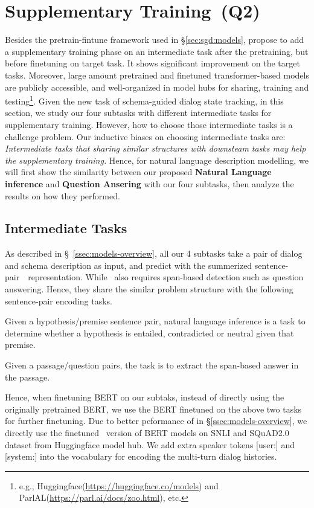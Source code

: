 \section{Supplementary Training~(Q2)}
\label{sec:sgd:sup-training}
Besides the pretrain-fintune framework used in \S\ref{sec:sgd:models},
\citet{phang2018sentence} propose to add a supplementary training
phase on an intermediate task after the pretraining, but before
finetuning on target task. It shows significant improvement on the
target tasks. Moreover, large amount pretrained and finetuned
transformer-based models are publicly accessible, and well-organized
in model hubs for sharing, training and testing\footnote{e.g.,
  Huggingface(\url{https://huggingface.co/models}) and
  ParlAL(\url{https://parl.ai/docs/zoo.html}), etc.}.  Given the new
task of schema-guided dialog state tracking, in this section, we study
our four subtasks with different intermediate tasks for supplementary
training. However, how to choose those intermediate tasks is a
challenge problem. Our inductive biases on choosing intermediate tasks
are: \textit{Intermediate tasks that sharing similar structures with
  downsteam tasks may help the supplementary training.}  Hence, for
natural language description modelling, we will first show the
similarity between our proposed \textbf{Natural Language inference}
and \textbf{Question Ansering} with our four subtasks, then analyze
the results on how they performed.

\subsection{Intermediate Tasks}
\label{ssec:intermediate-tasks}
As described in \S~\ref{ssec:models-overview}, all our 4
subtasks take a pair of dialog and schema description as input, and
predict with the summerized sentence-pair~\CLS~representation. While
\NSL~also requires span-based detection such as question
answering. Hence, they share the similar problem structure with the
following sentence-pair encoding tasks.

 Given a hypothesis/premise
sentence pair, natural language inference is a task to determine
whether a hypothesis is entailed, contradicted or neutral given
that premise.

 Given a passage/question pairs, the
task is to extract the span-based answer in the passage.

Hence, when finetuning BERT on our subtaks, instead of directly using
the originally pretrained BERT, we use the BERT
finetuned on the above two tasks for further finetuning.  Due to better
peformance of \CE in \S\ref{ssec:models-overview}, we directly use the finetuned
\CE~version of BERT models on SNLI and SQuAD2.0 dataset from
Huggingface model hub. We add extra speaker tokens [user:] and
[system:] into the vocabulary for encoding the multi-turn dialog
histories.
%


